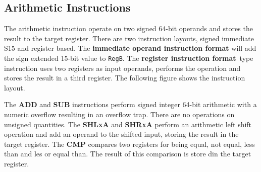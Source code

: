 \begin{figure}[H]
\begin{center}
\end{center}
\end{figure}


\subsection*{Arithmetic Instructions}

The arithmetic instruction operate on two signed 64-bit operands and stores the result to the target register. There are two instruction layouts, signed immediate S15 and register based. The \textbf{immediate operand instruction format} will add the sign extended 15-bit value to \texttt{RegB}. The \textbf{register instruction format} type instruction uses two registers as input operands, performs the operation and stores the result in a third register. The following figure shows the instruction layout.

The \textbf{ADD} and \textbf{SUB} instructions perform signed integer 64-bit arithmetic with a numeric overflow resulting in an overflow trap. There are no operations on unsigned quantities. The \textbf{SHLxA} and \textbf{SHRxA} perform an arithmetic left shift operation and add an operand to the shifted input, storing the result in the target register. The \textbf{CMP} compares two registers for being equal, not equal, less than and les or equal than. The result of this comparison is store din the target register.

